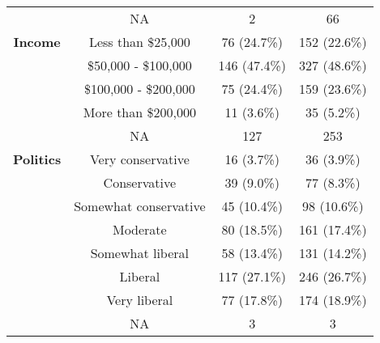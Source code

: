 \begin{table}[p]
\begin{tabular}[t]{>{}cccc}
 & NA & 2 & 66\\
\cmidrule{1-4}
\textbf{Income} & Less than \$25,000 & 76 (24.7\%) & 152 (22.6\%)\\

 & \$50,000 - \$100,000 & 146 (47.4\%) & 327 (48.6\%)\\

 & \$100,000 - \$200,000 & 75 (24.4\%) & 159 (23.6\%)\\

 & More than \$200,000 & 11 (3.6\%) & 35 (5.2\%)\\

 & NA & 127 & 253\\
\cmidrule{1-4}
\textbf{Politics} & Very conservative & 16 (3.7\%) & 36 (3.9\%)\\

 & Conservative & 39 (9.0\%) & 77 (8.3\%)\\

 & Somewhat conservative & 45 (10.4\%) & 98 (10.6\%)\\

 & Moderate & 80 (18.5\%) & 161 (17.4\%)\\

 & Somewhat liberal & 58 (13.4\%) & 131 (14.2\%)\\

 & Liberal & 117 (27.1\%) & 246 (26.7\%)\\

 & Very liberal & 77 (17.8\%) & 174 (18.9\%)\\

 & NA & 3 & 3\\
\bottomrule
\end{tabular}
\end{table}
